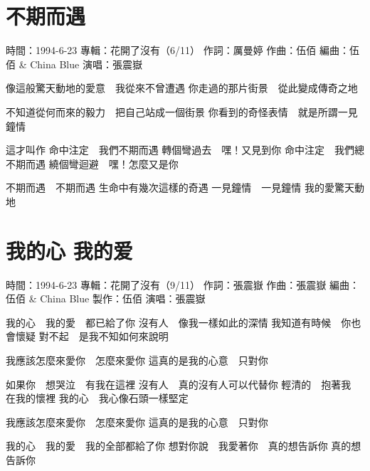\documentclass[UTF8,a4paper,oneside,twocolumn,12pt]{ctexbook}
\newcommand{\infopair}[2]{\textbullet #1：#2}
\newcommand{\zc}[1][伍佰]{\infopair{作詞}{#1}}
\newcommand{\zq}[1][伍佰]{\infopair{作曲}{#1}}
\newcommand{\bq}[1][伍佰]{\infopair{編曲}{#1}}
\newcommand{\zj}[1]{\infopair{專輯}{#1}}
\newcommand{\zz}[1]{\infopair{製作}{#1}}
\newcommand{\sj}[1]{\infopair{時間}{#1}}
\newenvironment{info}{\begin{flushleft}\kaishu
	}
	{\end{flushleft}\normalsize\yahei\par}
\newenvironment{lyric}{
	}
{}
\begin{document}
\section{不期而遇}
\begin{info}
	\sj{1994-6-23}
	\zj{花開了沒有（6/11）}
	\zc[厲曼婷]
	\zq
	\bq[伍佰 \& China Blue]
	\infopair{演唱}{張震嶽}
\end{info}
\begin{lyric}
	像這般驚天動地的愛意　我從來不曾遭遇
	你走過的那片街景　從此變成傳奇之地

	不知道從何而來的毅力　把自己站成一個街景
	你看到的奇怪表情　就是所謂一見鐘情

	這才叫作
	命中注定　我們不期而遇
	轉個彎過去　嘿！又見到你
	命中注定　我們總不期而遇
	繞個彎迴避　嘿！怎麼又是你

	不期而遇　不期而遇
	生命中有幾次這樣的奇遇
	一見鐘情　一見鐘情
	我的愛驚天動地
\end{lyric}

\section{我的心 我的爱}
\begin{info}
	\sj{1994-6-23}
	\zj{花開了沒有（9/11）}
	\zc[張震嶽]
	\zq[張震嶽]
	\bq[伍佰 \& China Blue]
	\zz{伍佰}
	\infopair{演唱}{張震嶽}
\end{info}
\begin{lyric}
	我的心　我的愛　都已給了你
	沒有人　像我一樣如此的深情
	我知道有時候　你也會懷疑
	對不起　是我不知如何來說明

	我應該怎麼來愛你　怎麼來愛你
	這真的是我的心意　只對你

	如果你　想哭泣　有我在這裡
	沒有人　真的沒有人可以代替你
	輕清的　抱著我　在我的懷裡
	我的心　我心像石頭一樣堅定

	我應該怎麼來愛你　怎麼來愛你
	這真的是我的心意　只對你

	我的心　我的愛　我的全部都給了你
	想對你說　我愛著你　真的想告訴你
	真的想告訴你
\end{lyric}
\end{document}
